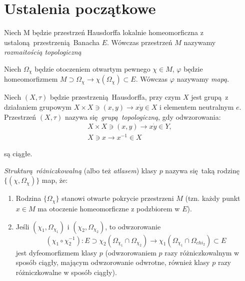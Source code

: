 \chapter{Ustalenia początkowe}
\begin{definicja}\cite[s. 253]{maurin2}
    Niech M będzie przestrzeń Hausdorffa lokalnie homeomorficzna z
    ustaloną przestrzenią Banacha \(E\). Wówczas przestrzeń \(M\) nazywamy \emph{rozmaitością
    topologiczną}
    
    Niech \(\Omega_\chi\) będzie otoczeniem otwartym pewnego \(\chi \in M\), \(\varphi\) będzie homeomorfizmem
    \(M \supset \Omega_{\chi} \rightarrow \chi(\Omega_{\chi}) \subset E\). Wówczas \(\varphi\) nazywamy
\emph{mapą}.

\begin{definicja}\cite[s. 41]{maurin2}
    Niech \((X, \tau)\) będzie przestrzenią Hausdorffa, przy czym \(X\) jest grupą z działaniem
    grupowym \(X\times X \ni (x, y) \rightarrow x\dot y \in X\) i elementem neutralnym \(e\).
    Przestrzeń \((X, \tau)\) nazywa się \emph{grupą topologiczną}, gdy odwzorowania:
    \begin{align*}
        X\times X \ni (x, y) \rightarrow x \dot y \in Y, \\ 
        X \ni x \rightarrow x^{-1} \in X
    \end{align*}
\end{definicja} są ciągłe.

\end{definicja}
\begin{definicja}\cite[s. 253]{maurin2}
\emph{Strukturą różniczkowalną} (albo też \emph{atlasem}) klasy \(p\) nazywa się taką
rodzinę \( \{(\chi, \Omega_{\chi})\} \) map, że:
\begin{enumerate}[label=(\alph*)]
    \item Rodzina \(\{\Omega_{\chi}\}\) stanowi otwarte pokrycie przestrzeni \(M\) (tzn. każdy punkt
        \(x\in M\) ma otoczenie homeomorficzne z podzbiorem w \(E\)).
    \item Jeśli \((\chi_1, \Omega_{\chi_1})\) i \((\chi_2, \Omega_{\chi_2})\), to odwzorowanie
        \begin{equation*}
            (\chi_1 \circ \chi_2^{-1}): E \supset \chi_2(\Omega_{\chi_1} \cap \Omega_{\chi_2})
            \rightarrow \chi_1(\Omega_{\chi_1} \cap \Omega_{chi_2}) \subset E 
        \end{equation*}
        jest dyfeomorfizmem klasy \(p\) (odwzorowaniem \(p\) razy różniczkowalnym w sposób ciągły,
        mającym odwzorowanie odwrotne, również klasy \(p\) razy różniczkowalne w sposób ciągły).
\end{enumerate}
\end{definicja}
